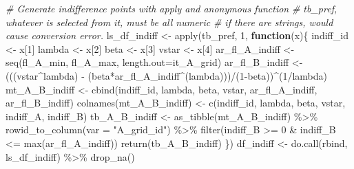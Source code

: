\documentclass[
]{book}
\newenvironment{Shaded}{\begin{snugshade}}{\end{snugshade}}
\newcommand{\AttributeTok}[1]{\textcolor[rgb]{0.77,0.63,0.00}{#1}}
\newcommand{\CommentTok}[1]{\textcolor[rgb]{0.56,0.35,0.01}{\textit{#1}}}
\newcommand{\ControlFlowTok}[1]{\textcolor[rgb]{0.13,0.29,0.53}{\textbf{#1}}}
\newcommand{\DecValTok}[1]{\textcolor[rgb]{0.00,0.00,0.81}{#1}}
\newcommand{\FunctionTok}[1]{\textcolor[rgb]{0.00,0.00,0.00}{#1}}
\newcommand{\NormalTok}[1]{#1}
\newcommand{\OtherTok}[1]{\textcolor[rgb]{0.56,0.35,0.01}{#1}}
\newcommand{\SpecialCharTok}[1]{\textcolor[rgb]{0.00,0.00,0.00}{#1}}
\newcommand{\StringTok}[1]{\textcolor[rgb]{0.31,0.60,0.02}{#1}}
\begin{document}
\begin{Shaded}
\begin{Highlighting}[]
\CommentTok{\# Generate indifference points with apply and anonymous function}
\CommentTok{\# tb\_pref, whatever is selected from it, must be all numeric}
\CommentTok{\# if there are strings, would cause conversion error.}
\NormalTok{ls\_df\_indiff }\OtherTok{\textless{}{-}} \FunctionTok{apply}\NormalTok{(tb\_pref, }\DecValTok{1}\NormalTok{, }\ControlFlowTok{function}\NormalTok{(x)\{}
\NormalTok{  indiff\_id }\OtherTok{\textless{}{-}}\NormalTok{ x[}\DecValTok{1}\NormalTok{]}
\NormalTok{  lambda }\OtherTok{\textless{}{-}}\NormalTok{ x[}\DecValTok{2}\NormalTok{]}
\NormalTok{  beta }\OtherTok{\textless{}{-}}\NormalTok{ x[}\DecValTok{3}\NormalTok{]}
\NormalTok{  vstar }\OtherTok{\textless{}{-}}\NormalTok{ x[}\DecValTok{4}\NormalTok{]}
\NormalTok{  ar\_fl\_A\_indiff }\OtherTok{\textless{}{-}} \FunctionTok{seq}\NormalTok{(fl\_A\_min, fl\_A\_max, }\AttributeTok{length.out=}\NormalTok{it\_A\_grid)}
\NormalTok{  ar\_fl\_B\_indiff }\OtherTok{\textless{}{-}}\NormalTok{ (((vstar}\SpecialCharTok{\^{}}\NormalTok{lambda) }\SpecialCharTok{{-}} 
\NormalTok{                        (beta}\SpecialCharTok{*}\NormalTok{ar\_fl\_A\_indiff}\SpecialCharTok{\^{}}\NormalTok{(lambda)))}\SpecialCharTok{/}\NormalTok{(}\DecValTok{1}\SpecialCharTok{{-}}\NormalTok{beta))}\SpecialCharTok{\^{}}\NormalTok{(}\DecValTok{1}\SpecialCharTok{/}\NormalTok{lambda)}
\NormalTok{  mt\_A\_B\_indiff }\OtherTok{\textless{}{-}} \FunctionTok{cbind}\NormalTok{(indiff\_id, lambda, beta, vstar,}
\NormalTok{                         ar\_fl\_A\_indiff, ar\_fl\_B\_indiff)}
  \FunctionTok{colnames}\NormalTok{(mt\_A\_B\_indiff) }\OtherTok{\textless{}{-}} \FunctionTok{c}\NormalTok{(}\StringTok{\textquotesingle{}indiff\_id\textquotesingle{}}\NormalTok{, }\StringTok{\textquotesingle{}lambda\textquotesingle{}}\NormalTok{, }\StringTok{\textquotesingle{}beta\textquotesingle{}}\NormalTok{, }\StringTok{\textquotesingle{}vstar\textquotesingle{}}\NormalTok{,}
                               \StringTok{\textquotesingle{}indiff\_A\textquotesingle{}}\NormalTok{, }\StringTok{\textquotesingle{}indiff\_B\textquotesingle{}}\NormalTok{)}
\NormalTok{  tb\_A\_B\_indiff }\OtherTok{\textless{}{-}} \FunctionTok{as\_tibble}\NormalTok{(mt\_A\_B\_indiff) }\SpecialCharTok{\%\textgreater{}\%} 
    \FunctionTok{rowid\_to\_column}\NormalTok{(}\AttributeTok{var =} \StringTok{"A\_grid\_id"}\NormalTok{) }\SpecialCharTok{\%\textgreater{}\%} 
    \FunctionTok{filter}\NormalTok{(indiff\_B }\SpecialCharTok{\textgreater{}=} \DecValTok{0} \SpecialCharTok{\&}\NormalTok{ indiff\_B }\SpecialCharTok{\textless{}=} \FunctionTok{max}\NormalTok{(ar\_fl\_A\_indiff))}
  \FunctionTok{return}\NormalTok{(tb\_A\_B\_indiff)}
\NormalTok{\})}
\NormalTok{df\_indiff }\OtherTok{\textless{}{-}} \FunctionTok{do.call}\NormalTok{(rbind, ls\_df\_indiff) }\SpecialCharTok{\%\textgreater{}\%} \FunctionTok{drop\_na}\NormalTok{()}
\end{Highlighting}
\end{Shaded}
\end{document}
